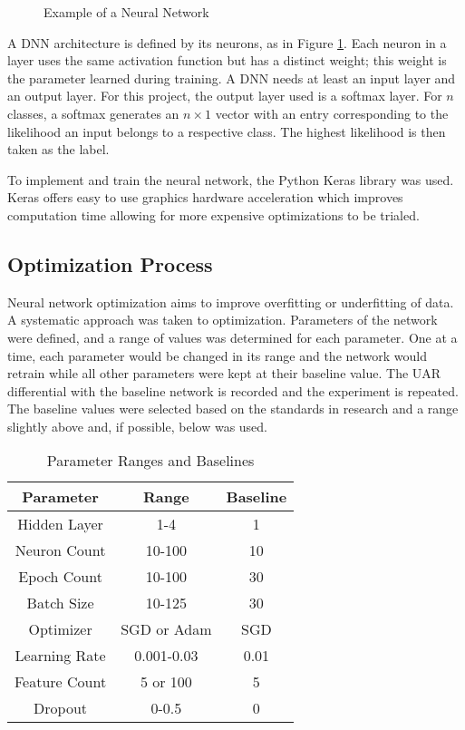 		\begin{figure}[!htb]
		\caption{\label{fig:dnnBase} Example of a Neural Network}
	\end{figure}

	 A DNN architecture is defined by its neurons, as in Figure \ref{fig:dnnBase}.  Each neuron in a layer uses the same activation function but has a distinct weight; this weight is the parameter learned during training. A DNN needs at least an input layer and an output layer. For this project, the output layer used is a softmax layer. For $n$ classes, a softmax generates an $n \times 1$ vector with an entry corresponding to the likelihood an input belongs to a respective class. The highest likelihood is then taken as the label.
	 
	 To implement and train the neural network, the Python Keras library was used. Keras offers easy to use graphics hardware acceleration which improves computation time allowing for more expensive optimizations to be trialed.
\subsection{Optimization Process}
	Neural network optimization aims to improve overfitting or underfitting of data. A systematic approach was taken to optimization. Parameters of the network were defined, and a range of values was determined for each parameter. One at a time, each parameter would be changed in its range and the network would retrain while all other parameters were kept at their baseline value. The UAR differential with the baseline network is recorded and the experiment is repeated. The baseline values were selected based on the standards in research and a range slightly above and, if possible, below was used.
	\begin{table}[!hbt]
		\centering
		\caption{Parameter Ranges and Baselines}
		\begin{tabular}{|c|c|c|}
			\hline
			Parameter     & Range       & Baseline \\ \hline
			Hidden Layer  & 1-4         & 1        \\ \hline
			Neuron Count  & 10-100      & 10       \\ \hline
			Epoch Count   & 10-100      & 30       \\ \hline
			Batch Size    & 10-125      & 30       \\ \hline
			Optimizer     & SGD or Adam & SGD      \\ \hline
			Learning Rate & 0.001-0.03  & 0.01     \\ \hline
			Feature Count & 5 or 100    & 5        \\ \hline
			Dropout       & 0-0.5       & 0        \\ \hline
		\end{tabular}
	\label{params}
	\end{table}

